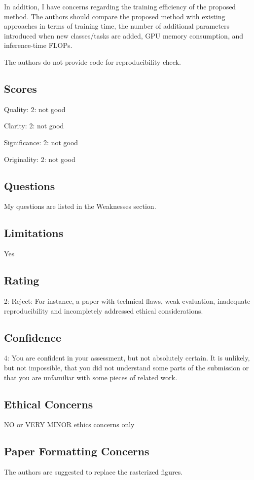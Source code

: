 \documentclass[11pt]{article}
\begin{document}
In addition, I have concerns regarding the training efficiency of the proposed method. The authors should compare the proposed method with existing approaches in terms of training time, the number of additional parameters introduced when new classes/tasks are added, GPU memory consumption, and inference-time FLOPs.

The authors do not provide code for reproducibility check.

\subsection*{Scores}
Quality: 2: not good

Clarity: 2: not good

Significance: 2: not good

Originality: 2: not good

\subsection*{Questions}
My questions are listed in the Weaknesses section.

\subsection*{Limitations}
Yes

\subsection*{Rating}
2: Reject: For instance, a paper with technical flaws, weak evaluation, inadequate reproducibility and incompletely addressed ethical considerations.

\subsection*{Confidence}
4: You are confident in your assessment, but not absolutely certain. It is unlikely, but not impossible, that you did not understand some parts of the submission or that you are unfamiliar with some pieces of related work.

\subsection*{Ethical Concerns}
NO or VERY MINOR ethics concerns only

\subsection*{Paper Formatting Concerns}
The authors are suggested to replace the rasterized figures.
\end{document}
